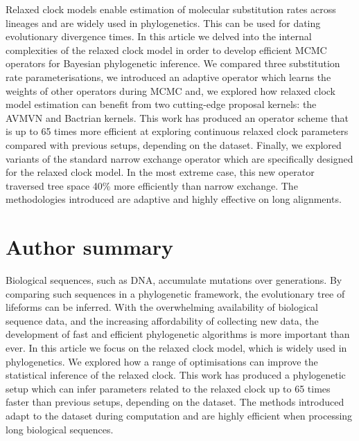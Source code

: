 \documentclass[10pt,letterpaper]{article}
\begin{document}
Relaxed clock models enable estimation of molecular substitution rates across lineages and are widely used in phylogenetics.
This can be used for dating evolutionary divergence times.
In this article we delved into the internal complexities of the relaxed clock model in order to develop efficient MCMC operators for Bayesian phylogenetic inference.
We compared three substitution rate parameterisations, we introduced an adaptive operator which learns the weights of other operators during MCMC and, we explored how relaxed clock model estimation can benefit from two cutting-edge proposal kernels: the AVMVN and Bactrian kernels.
This work has produced an operator scheme that is up to 65 times more efficient at exploring continuous relaxed clock parameters compared with previous setups, depending on the dataset.
Finally, we explored variants of the standard narrow exchange operator which are specifically designed for the relaxed clock model.
In the most extreme case, this new operator traversed tree space 40\% more efficiently than narrow exchange.
The methodologies introduced are adaptive and highly effective on long alignments. 


\section*{Author summary}

Biological sequences, such as DNA, accumulate mutations over generations. 
By comparing such sequences in a phylogenetic framework, the evolutionary tree of lifeforms can be inferred.
With the overwhelming availability of biological sequence data, and the increasing affordability of collecting new data, the development of fast and efficient phylogenetic algorithms is more important than ever.
In this article we focus on the relaxed clock model, which is widely used in phylogenetics.
We explored how a range of optimisations can improve the statistical inference of the relaxed clock.
This work has produced a phylogenetic setup which can infer parameters related to the relaxed clock up to 65 times faster than previous setups, depending on the dataset.
The methods introduced adapt to the dataset during computation and are highly efficient when processing long biological sequences.    


\linenumbers
\end{document}
